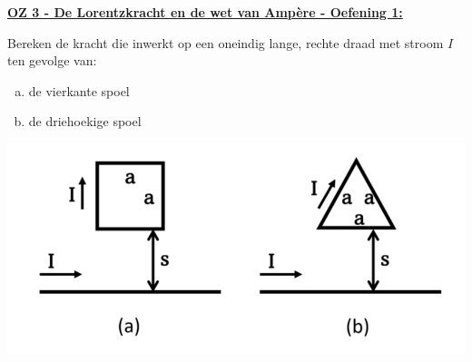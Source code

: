 \textbf{\underline{OZ 3 - De Lorentzkracht en de wet van Ampère - Oefening 1:}}
\vspace{0.5cm}

Bereken de kracht die inwerkt op een oneindig lange, rechte draad met stroom $I$ ten gevolge van:
\begin{enumerate}[(a)]
    \item de vierkante spoel
    \item de driehoekige spoel
\end{enumerate}

\begin{center}
    \includegraphics[scale = 0.5]{oz03/resources/Oz3Oef1.png}
\end{center}


